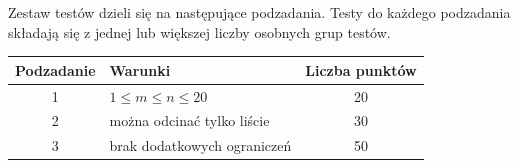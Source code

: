 \documentclass[10pt]{article}
\begin{document}
    Zestaw testów dzieli się na następujące podzadania. Testy do każdego podzadania składają się z jednej lub większej liczby osobnych grup testów.
    
    \begin{center}
        \begin{tabular}{ |c|p{9cm}|c| }
            \hline
            \textbf{Podzadanie} & \textbf{Warunki} & \textbf{Liczba punktów}\\
            \hline
            1 & $1 \leq m \leq n \leq 20$ & 20\\
            \hline
            2 & można odcinać tylko liście\footnotemark & 30\\
            \hline
            3 & brak dodatkowych ograniczeń & 50\\
            \hline
        \end{tabular}
    \end{center}
\end{document}
